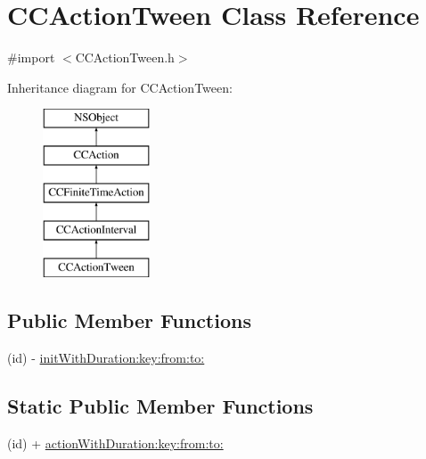 \hypertarget{interface_c_c_action_tween}{\section{C\-C\-Action\-Tween Class Reference}
\label{interface_c_c_action_tween}
}


{\ttfamily \#import $<$C\-C\-Action\-Tween.\-h$>$}

Inheritance diagram for C\-C\-Action\-Tween\-:\begin{figure}[H]
\begin{center}
\leavevmode
\includegraphics[height=5.000000cm]{interface_c_c_action_tween}
\end{center}
\end{figure}
\subsection*{Public Member Functions}
\begin{DoxyCompactItemize}
\item 
(id) -\/ \hyperlink{interface_c_c_action_tween_a5ff7d9611039655bbbbdfa28720b25e6}{init\-With\-Duration\-:key\-:from\-:to\-:}
\end{DoxyCompactItemize}
\subsection*{Static Public Member Functions}
\begin{DoxyCompactItemize}
\item 
(id) + \hyperlink{interface_c_c_action_tween_af76444667fbb59064d372c02759726a3}{action\-With\-Duration\-:key\-:from\-:to\-:}
\end{DoxyCompactItemize}
